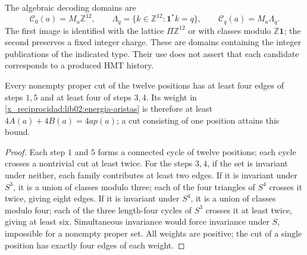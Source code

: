 The algebraic decoding domains are
\[
 \mathcal C_0(a)=M_a\mathbb Z^{12},\qquad
 \Lambda_q=\{k\in\mathbb Z^{12}:\mathbf1^*k=q\},\qquad
 \mathcal C_q(a)=M_a\Lambda_q.
\]
The first image is identified with the lattice \(\Pi\mathbb Z^{12}\)
or with classes modulo \(\mathbb Z\mathbf1\); the second preserves a
fixed integer charge. These are domains containing the integer publications
of the indicated type. Their use does not assert that each candidate corresponds to a
produced HMT history.

\begin{lemma}
\label{x_reciprocidad:lib02:cortes}
Every nonempty proper cut of the twelve positions has at least four edges of steps \(1,5\) and at least four of steps \(3,4\). Its weight in \eqref{x_reciprocidad:lib02:energia-aristas} is therefore at least \(4A(a)+4B(a)=4ap(a)\); a cut consisting of one position attains this bound.
\end{lemma}
\begin{proof}
Each step \(1\) and \(5\) forms a connected cycle of twelve positions;
each cycle crosses a nontrivial cut at least twice. For the steps
\(3,4\), if the set is invariant under neither, each family
contributes at least two edges. If it is invariant under \(S^3\), it is a union
of classes modulo three; each of the four triangles of \(S^4\)
crosses it twice, giving eight edges. If it is invariant under \(S^4\),
it is a union of classes modulo four; each of the three length-four cycles
of \(S^3\) crosses it at least twice, giving at least six.
Simultaneous invariance would force invariance under \(S\), impossible
for a nonempty proper set. All weights are positive; the
cut of a single position has exactly four edges of each
weight.
\end{proof}

